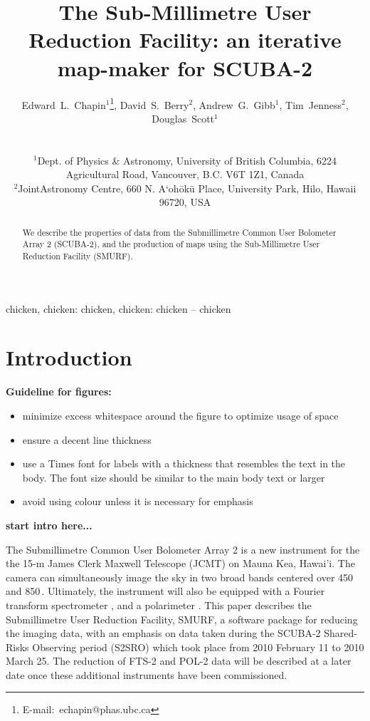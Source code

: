 \documentclass[useAMS,usenatbib,nofootinbib]{mn2e}
\title[SMURF: an iterative map-maker for SCUBA-2]{The Sub-Millimetre User
Reduction Facility: an iterative map-maker for SCUBA-2}
\author[Edward~L.~Chapin~et~al.]{
  \parbox[t]{\textwidth}{
    Edward~L.~Chapin$^{1}$\thanks{E-mail:~echapin@phas.ubc.ca},
    David~S.~Berry$^{2}$,
    Andrew~G.~Gibb$^{1}$,
    Tim~Jenness$^{2}$,
    Douglas~Scott$^{1}$
  }
  \\
  \\
  $^{1}$Dept. of Physics \& Astronomy, University of British Columbia,
  6224 Agricultural Road, Vancouver, B.C. V6T 1Z1, Canada\\
  $^{2}$JointAstronomy Centre, 660 N. A`oh\={o}k\={u} Place, University
  Park, Hilo, Hawaii 96720, USA}
\newcommand{\scuba}{SCUBA-2}
\begin{document}
\label{firstpage}

\maketitle

\begin{abstract}
  We describe the properties of data from the Submillimetre Common
  User Bolometer Array 2 (SCUBA-2), and the production of maps using
  the Sub-Millimetre User Reduction Facility (SMURF).
\end{abstract}


\begin{keywords}
chicken, chicken: chicken, chicken: chicken -- chicken
\end{keywords}

\section{Introduction}
\label{sec:intro}

\textbf{Guideline for figures:}

\begin{itemize}
\item minimize excess whitespace around the figure to optimize usage of space
\item ensure a decent line thickness
\item use a Times font for labels with a thickness that resembles the
  text in the body. The font size should be similar to the main body
  text or larger
\item avoid using colour unless it is necessary for emphasis
\end{itemize}

\textbf{start intro here...}

The Submillimetre Common User Bolometer Array 2
\citep[\scuba,][]{holland2006} is a new instrument for the the 15-m
James Clerk Maxwell Telescope (JCMT) on Mauna Kea, Hawai'i. The camera
can simultaneously image the sky in two broad bands centered over 450
and 850\,\micron. Ultimately, the instrument will also be equipped
with a Fourier transform spectrometer \citep[FTS-2,][]{gom2010}, and a polarimeter
\cite[POL-2,][]{bastien2005}. This paper describes the Submillimetre User Reduction Facility,
SMURF, a software package for reducing the imaging data, with an
emphasis on data taken during the SCUBA-2 Shared-Risks Observing period
(S2SRO) which took place from 2010 February 11 to 2010 March 25. The reduction
of FTS-2 and POL-2 data will be described at a later date once these
additional instruments have been commissioned.
\end{document}
